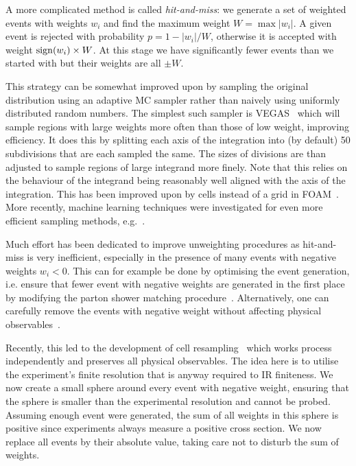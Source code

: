 A more complicated method is called \emph{hit-and-miss}:
we generate a set of weighted events with weights $w_i$ and find the maximum weight $W=\max |w_i|$.
A given event is rejected with probability $p=1-|w_i|/W$, otherwise it is accepted with weight ${\rm sign}(w_i)\times W$.
At this stage we have significantly fewer events than we started with but their weights are all $\pm W$.

This strategy can be somewhat improved upon by sampling the original distribution using an adaptive MC sampler rather than naively using uniformly distributed random numbers.
The simplest such sampler is VEGAS~\cite{Lepage:1980dq} which will sample regions with large weights more often than those of low weight, improving efficiency.
It does this by splitting each axis of the integration into (by default) 50 subdivisions that are each sampled the same.
The sizes of divisions are than adjusted to sample regions of large integrand more finely.
Note that this relies on the behaviour of the integrand being reasonably well aligned with the axis of the integration.
This has been improved upon by cells instead of a grid in FOAM~\cite{Jadach:2002kn}.
More recently, machine learning techniques were investigated for even more efficient sampling methods, e.g.~\cite{Gao:2020vdv,Bothmann:2020ywa,Gao:2020zvv}.

Much effort has been dedicated to improve unweighting procedures as hit-and-miss is very inefficient, especially in the presence of many events with negative weights $w_i<0$.
This can for example be done by optimising the event generation, i.e. ensure that fewer event with negative weights are generated in the first place by modifying the parton shower matching procedure~\cite{Danziger:2021xvr,Frederix:2020trv}.
Alternatively, one can carefully remove the events with negative weight without affecting physical observables~\cite{Andersen:2020sjs,Nachman:2020fff,Stienen:2020gns}.

Recently, this led to the development of cell resampling~\cite{Andersen:2021mvw} which works process independently and preserves all physical observables.
The idea here is to utilise the experiment's finite resolution that is anyway required to IR finiteness.
We now create a small sphere around every event with negative weight, ensuring that the sphere is smaller than the experimental resolution and cannot be probed.
Assuming enough event were generated, the sum of all weights in this sphere is positive since experiments always measure a positive cross section. 
We now replace all events by their absolute value, taking care not to disturb the sum of weights.


